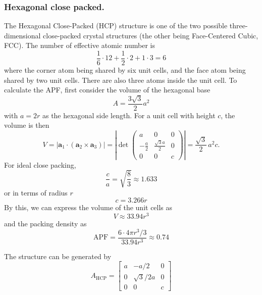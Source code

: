\documentclass[../../../main.tex]{subfiles}
\begin{document}
\subsubsection{Hexagonal close packed.}
The Hexagonal Close-Packed (HCP) structure is one of the two possible three-dimensional close-packed crystal structures (the other being Face-Centered Cubic, FCC).
The number of effective atomic number is
\begin{equation*}
    \frac{1 }{6 }\cdot 12+\frac{1 }{2 }\cdot 2+1 \cdot 3=6
\end{equation*}
where the corner atom being shared by six unit cells, and the face atom being shared by two unit cells.
There are also three atoms inside the unit cell.
To calculate the APF, first consider the volume of the hexagonal base
\begin{equation*}
    A=\frac{3 \sqrt{3 }}{2 }a^2
\end{equation*}
with $a=2r$ as the hexagonal side length.
For a unit cell with height $c$, the volume is then
\begin{equation*}
    V = \left|\mathbf{a}_1 \cdot (\mathbf{a}_2 \times \mathbf{a}_3)\right|=
    \left|
    \det
    \begin{pmatrix}
        a             & 0                    & 0 \\[4pt]
        -\tfrac{a}{2} & \tfrac{\sqrt{3}a}{2} & 0 \\[4pt]
        0             & 0                    & c
    \end{pmatrix}
    \right|
    = \frac{\sqrt{3}}{2}\,a^{2}c.
\end{equation*}
For ideal close packing,
\begin{equation*}
    \frac{c }{a }=\sqrt{\frac{8 }{3 }}\approx1.633
\end{equation*}
or in terms of radius $r$
\begin{equation*}
    c=3.266r
\end{equation*}
By this, we can express the volume of the unit cells as
\begin{equation*}
    V\approx33.94r^3
\end{equation*}
and the packing density as
\begin{equation*}
    \text{APF}=\frac{6 \cdot 4\pi r^3/3 }{33.94r^3}\approx 0.74
\end{equation*}

The structure can be generated by
\begin{equation*}
    A_{\text{HCP}} =
    \begin{bmatrix}
        a & -a/2          & 0 \\
        0 & \sqrt{3}/{2}a & 0 \\
        0 & 0             & c
    \end{bmatrix}
\end{equation*}
\end{document}
